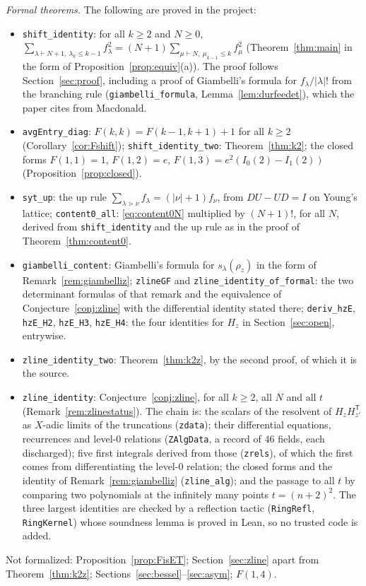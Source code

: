 \documentclass[11pt]{article}
\theoremstyle{definition}
\theoremstyle{remark}
\begin{document}
\emph{Formal theorems.} The following are proved in the project:
\begin{itemize}[leftmargin=1.5em]
\item \texttt{shift\_identity}: for all $k\ge2$ and $N\ge0$, $\sum_{\lambda\vdash N+1,\ \lambda_k\le k-1}f_\lambda^2=(N+1)\sum_{\mu\vdash N,\ \mu_{k-1}\le k}f_\mu^2$ (Theorem~\ref{thm:main} in the form of Proposition~\ref{prop:equiv}(a)). The proof follows Section~\ref{sec:proof}, including a proof of Giambelli's formula for $f_\lambda/|\lambda|!$ from the branching rule (\texttt{giambelli\_formula}, Lemma~\ref{lem:durfeedet}), which the paper cites from Macdonald.
\item \texttt{avgEntry\_diag}: $F(k,k)=F(k-1,k+1)+1$ for all $k\ge2$ (Corollary~\ref{cor:Fshift}); \texttt{shift\_identity\_two}: Theorem~\ref{thm:k2}; the closed forms $F(1,1)=1$, $F(1,2)=e$, $F(1,3)=e^2(I_0(2)-I_1(2))$ (Proposition~\ref{prop:closed}).
\item \texttt{syt\_up}: the up rule $\sum_{\lambda\gtrdot\nu}f_\lambda=(|\nu|+1)f_\nu$, from $DU-UD=I$ on Young's lattice; \texttt{content0\_all}: \eqref{eq:content0N} multiplied by $(N+1)!$, for all $N$, derived from \texttt{shift\_identity} and the up rule as in the proof of Theorem~\ref{thm:content0}.
\item \texttt{giambelli\_content}: Giambelli's formula for $s_\lambda(\rho_z)$ in the form of Remark~\ref{rem:giambelliz}; \texttt{zlineGF} and \texttt{zline\_identity\_of\_formal}: the two determinant formulas of that remark and the equivalence of Conjecture~\ref{conj:zline} with the differential identity stated there; \texttt{deriv\_hzE}, \texttt{hzE\_H2}, \texttt{hzE\_H3}, \texttt{hzE\_H4}: the four identities for $H_z$ in Section~\ref{sec:open}, entrywise.
\item \texttt{zline\_identity\_two}: Theorem~\ref{thm:k2z}, by the second proof, of which it is the source.
\item \texttt{zline\_identity}: Conjecture~\ref{conj:zline}, for all $k\ge2$, all $N$ and all $t$ (Remark~\ref{rem:zlinestatus}). The chain is: the scalars of the resolvent of $H_zH_{z'}^{\mathsf T}$ as $X$-adic limits of the truncations (\texttt{zdata}); their differential equations, recurrences and level-$0$ relations (\texttt{ZAlgData}, a record of $46$ fields, each discharged); five first integrals derived from those (\texttt{zrels}), of which the first comes from differentiating the level-$0$ relation; the closed forms and the identity of Remark~\ref{rem:giambelliz} (\texttt{zline\_alg}); and the passage to all $t$ by comparing two polynomials at the infinitely many points $t=(n+2)^2$. The three largest identities are checked by a reflection tactic (\texttt{RingRefl}, \texttt{RingKernel}) whose soundness lemma is proved in Lean, so no trusted code is added.
\end{itemize}
Not formalized: Proposition~\ref{prop:FisET}; Section~\ref{sec:zline} apart from Theorem~\ref{thm:k2z}; Sections~\ref{sec:bessel}--\ref{sec:asym}; $F(1,4)$.
\end{document}
